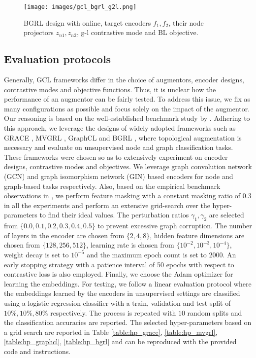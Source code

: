 \documentclass{article}
\theoremstyle{plain}
\theoremstyle{definition}
\theoremstyle{remark}
\begin{document}
\begin{figure*}[ht]
\vskip 0.2in
\begin{center}
\centerline{\texttt{[image: images/gcl\_bgrl\_g2l.png]}}
\caption{BGRL design with online, target encoders $f_1, f_2$, their node projectors $z_{n1}, z_{n2}$, g-l contrastive mode and BL objective.} 
\label{fig:gcl_bgrl_g2l}
\end{center}
\vskip -0.2in
\end{figure*}


\subsection{Evaluation protocols}

Generally, GCL frameworks differ in the choice of augmentors, encoder designs, contrastive modes and objective functions. Thus, it is unclear how the performance of an augmentor can be fairly tested. To address this issue, we fix as many configurations as possible and focus solely on the impact of the augmentor. Our reasoning is based on the well-established benchmark study by \citet{zhu2021empirical}. Adhering to this approach, we leverage the designs of widely adopted frameworks such as GRACE \citep{zhu2020deep}, MVGRL \citep{hassani2020contrastive}, GraphCL \citep{you2020graph} and BGRL \citep{thakoor2021bootstrapped}, where topological augmentation is necessary and evaluate on unsupervised node and graph classification tasks. These frameworks were chosen so as to extensively experiment on encoder designs, contrastive modes and objectives. We leverage graph convolution network (GCN) \citep{kipf2016semi} and graph isomorphism network (GIN) \cite{xu2018powerful} based encoders for node and graph-based tasks respectively. Also, based on the empirical benchmark observations in \citet{zhu2021empirical}, we perform feature masking with a constant masking ratio of $0.3$ in all the experiments and perform an extensive grid-search over the hyper-parameters to find their ideal values. The perturbation ratios $\gamma_1, \gamma_2$ are selected from $\{0.0, 0.1, 0.2, 0.3, 0.4, 0.5\}$ to prevent excessive graph corruption. The number of layers in the encoder are chosen from $\{ 2, 4, 8 \}$, hidden feature dimensions are chosen from $\{ 128, 256, 512 \}$, learning rate is chosen from $\{10^{-2}, 10^{-3}, 10^{-4}\}$, weight decay is set to $10^{-5}$ and the maximum epoch count is set to $2000$. An early stopping strategy with a patience interval of 50 epochs with respect to contrastive loss is also employed. Finally, we choose the Adam optimizer for learning the embeddings. For testing, we follow a linear evaluation protocol \citep{velickovic2019deep, zhu2021empirical} where the embeddings learned by the encoders in unsupervised settings are classified using a logistic regression classifier with a train, validation and test split of $10\%, 10\%, 80\%$ respectively. The process is repeated with $10$ random splits and the classification accuracies are reported. The selected hyper-parameters based on a grid search are reported in Table \ref{table:hp_grace}, \ref{table:hp_mvgrl}, \ref{table:hp_graphcl}, \ref{table:hp_bgrl} and can be reproduced with the provided code and instructions.
\end{document}
